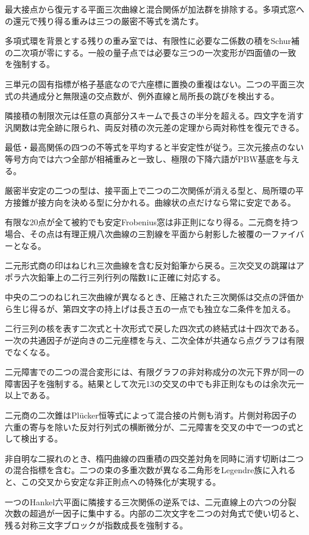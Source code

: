 \documentclass[11pt,a4paper]{ltjsarticle}
\begin{document}
最大接点から復元する平面三次曲線と混合関係が加法群を排除する。多項式窓への還元で残り得る重みは三つの厳密不等式を満たす。

多項式環を背景とする残りの重み室では、有限性に必要な二係数の積をSchur補の二次項が零にする。一般の量子点では必要な三つの一次変形が四面値の一致を強制する。

三単元の固有指標が格子基底なので六座標に置換の重複はない。二つの平面三次式の共通成分と無限遠の交点数が、例外直線と局所長の跳びを検出する。

隣接積の制限次元は任意の真部分スキームで長さの半分を超える。四文字を消す汎関数は完全跡に限られ、両反対積の次元差の定理から両対称性を復元できる。

最低・最高関係の四つの不等式を平均すると半安定性が従う。三次元接点のない等号方向では六つ全部が相補重みと一致し、極限の下降六語がPBW基底を与える。

厳密半安定の二つの型は、接平面上で二つの二次関係が消える型と、局所環の平方接錐が接方向を決める型に分かれる。曲線状の点だけなら常に安定である。

有限な20点が全て被約でも安定Frobenius窓は非正則になり得る。二元商を持つ場合、その点は有理正規八次曲線の三割線を平面から射影した被覆の一ファイバーとなる。

二元形式商の印はねじれ三次曲線を含む反対鉛筆から戻る。三次交叉の跳躍はアポラ六次鉛筆上の二行三列行列の階数1に正確に対応する。

中央の二つのねじれ三次曲線が異なるとき、圧縮された三次関係は交点の評価から生じ得るが、第四文字の持上げは長さ五の一点でも独立な二条件を加える。

二行三列の核を表す二次式と十次形式で戻した四次式の終結式は十四次である。一次の共通因子が逆向きの二元座標を与え、二次全体が共通なら点グラフは有限でなくなる。

二元障害での二つの混合変形には、有限グラフの非対称成分の次元下界が同一の障害因子を強制する。結果として次元13の交叉の中でも非正則なものは余次元一以上である。

二元商の二次錐はPlücker恒等式によって混合接の片側も消す。片側対称因子の六重の寄与を除いた反対行列式の横断微分が、二元障害を交叉の中で一つの式として検出する。

非自明な二捩れのとき、楕円曲線の四重積の四交差対角を同時に消す切断は二つの混合指標を含む。二つの束の多重次数が異なる二角形をLegendre族に入れると、この交叉から安定な非正則点への特殊化が実現する。

一つのHankel六平面に隣接する三次関係の逆系では、二元直線上の六つの分裂次数の超過が一因子に集中する。内部の二次文字を二つの対角式で使い切ると、残る対称三文字ブロックが指数成長を強制する。
\end{document}
